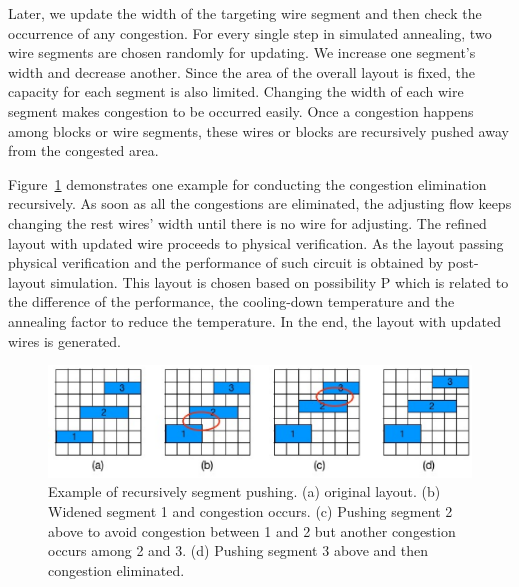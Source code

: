   Later, we update the width of the targeting wire segment and then check the occurrence of any congestion. For every single step in simulated annealing, two wire segments are chosen randomly for updating. We increase one segment's width and decrease another. Since the area of the overall layout is fixed, the capacity for each segment is also limited. Changing the width of each wire segment makes congestion to be occurred easily. Once a congestion happens among blocks or wire segments, these wires or blocks are recursively pushed away from the congested area.

  Figure~\ref{fig:Congestion} demonstrates one example for conducting the congestion elimination recursively. As soon as all the congestions are eliminated, the adjusting flow keeps changing the rest wires' width until there is no wire for adjusting. The refined layout with updated wire proceeds to physical verification. As the layout passing physical verification and the performance of such circuit is obtained by post-layout simulation. This layout is chosen based on possibility P which is related to the difference of the performance, the cooling-down temperature and the annealing factor to reduce the temperature. In the end, the layout with updated wires is generated.
  \begin{figure}[t]
    \centering
    \centerline{\includegraphics[width=\textwidth]{Fig/Congestion.eps}}
    \caption{Example of recursively segment pushing. (a) original layout. (b) Widened segment 1 and congestion occurs. (c) Pushing segment 2 above to avoid congestion between 1 and 2 but another congestion occurs among 2 and 3. (d) Pushing segment 3 above and then congestion eliminated.} 
    \label{fig:Congestion}
  \end{figure}